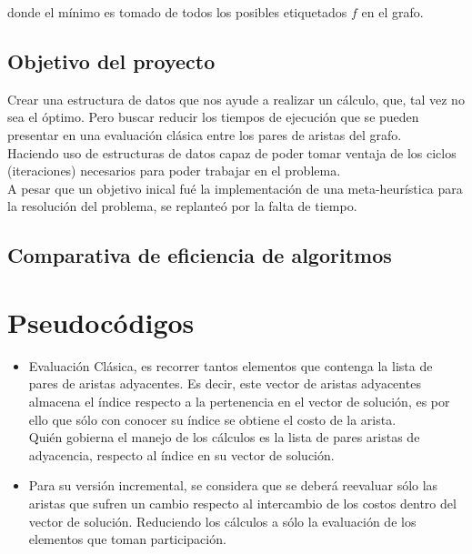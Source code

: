 \documentclass[oneside,onecolumn]{article}
\begin{document}
donde el mínimo es tomado de todos los posibles etiquetados $f$ en el grafo.\\


\subsection{Objetivo del proyecto}

Crear una estructura de datos que nos ayude a realizar un cálculo, que, tal vez no sea el óptimo. Pero buscar reducir los tiempos de ejecución que se pueden presentar en una evaluación clásica entre los pares de aristas del grafo.\\
Haciendo uso de estructuras de datos capaz de poder tomar ventaja de los ciclos (iteraciones) necesarios para poder trabajar en el problema.\\

A pesar que un objetivo inical fué la implementación de una meta-heurística para la resolución del problema, se replanteó por la falta de tiempo.

\subsection{Comparativa de eficiencia de algoritmos}



\newpage
\section{Pseudocódigos}

\begin{itemize}
  \item Evaluación Clásica, es recorrer tantos elementos que contenga la lista de pares de aristas adyacentes. Es decir, este vector de aristas adyacentes almacena el índice respecto a la pertenencia en el vector de solución, es por ello que sólo con conocer su índice se obtiene el costo de la arista.\\

    Quién gobierna el manejo de los cálculos es la lista de pares aristas de adyacencia, respecto al índice en su vector de solución.\\
    
  \item Para su versión incremental, se considera que se deberá reevaluar sólo las aristas que sufren un cambio respecto al intercambio de los costos dentro del vector de solución. Reduciendo los cálculos a sólo la evaluación de los elementos que toman participación.
\end{itemize}
\end{document}
